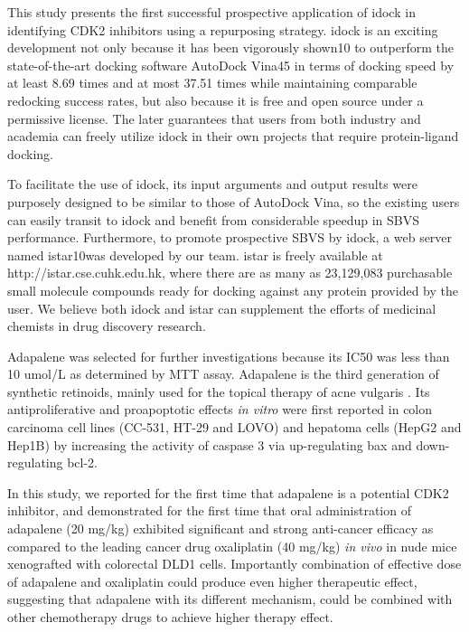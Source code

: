 This study presents the first successful prospective application of idock \citep{1153,1362} in identifying CDK2 inhibitors using a repurposing strategy. idock is an exciting development not only because it has been vigorously shown10 to outperform the state-of-the-art docking software AutoDock Vina45 in terms of docking speed by at least 8.69 times and at most 37.51 times while maintaining comparable redocking success rates, but also because it is free and open source under a permissive license. The later guarantees that users from both industry and academia can freely utilize idock in their own projects that require protein-ligand docking.

To facilitate the use of idock, its input arguments and output results were purposely designed to be similar to those of AutoDock Vina, so the existing users can easily transit to idock and benefit from considerable speedup in SBVS performance. Furthermore, to promote prospective SBVS by idock, a web server named istar10was developed by our team. istar is freely available at http://istar.cse.cuhk.edu.hk, where there are as many as 23,129,083 purchasable small molecule compounds ready for docking against any protein provided by the user. We believe both idock\citep{1153} and istar \citep{1362} can supplement the efforts of medicinal chemists in drug discovery research.

Adapalene was selected for further investigations because its IC50 was less than 10 umol/L as determined by MTT assay. Adapalene is the third generation of synthetic retinoids, mainly used for the topical therapy of acne vulgaris \citep{1599}. Its antiproliferative and proapoptotic effects \textit{in vitro} were first reported in colon carcinoma cell lines (CC-531, HT-29 and LOVO) \citep{1600} and hepatoma cells (HepG2 and Hep1B) \citep{1601} by increasing the activity of caspase 3 via up-regulating bax and down-regulating bcl-2.

In this study, we reported for the first time that adapalene is a potential CDK2 inhibitor, and demonstrated for the first time that oral administration of adapalene (20 mg/kg) exhibited significant and strong anti-cancer efficacy as compared to the leading cancer drug oxaliplatin (40 mg/kg) \textit{in vivo} in nude mice xenografted with colorectal DLD1 cells. Importantly combination of effective dose of adapalene and oxaliplatin could produce even higher therapeutic effect, suggesting that adapalene with its different mechanism, could be combined with other chemotherapy drugs to achieve higher therapy effect.

